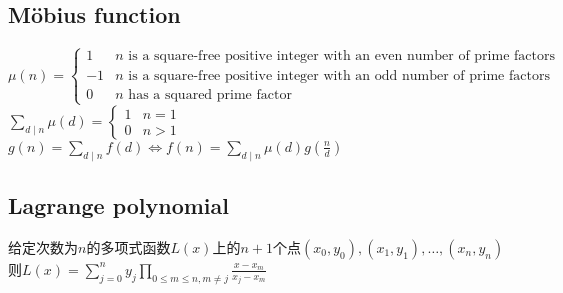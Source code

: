 	\subsection*{Möbius function}
		$ \mu(n) = \begin{cases}
			1 & n \text{ is a square-free positive integer with an even number of prime factors}\\
			-1 & n \text{ is a square-free positive integer with an odd number of prime factors}\\
			0 & n \text{ has a squared prime factor}
		\end{cases} $
		\\$ \sum\limits_{d \mid n} \mu(d) = \begin{cases}
			1 & n = 1\\
			0 & n > 1
		\end{cases} $
		\\$ g(n) = \sum\limits_{d \mid n} f(d) \Leftrightarrow f(n) = \sum\limits_{d \mid n} \mu(d) g(\frac{n}{d}) $
	\subsection*{Lagrange polynomial}
		给定次数为$ n $的多项式函数$ L(x) $上的$ n + 1 $个点$ (x_0, y_0), (x_1, y_1), \dots, (x_n, y_n) $
		\\则$ L(x) = \sum\limits_{j = 0}^{n} y_j \prod\limits_{0 \leq m \leq n, m \ne j} \frac{x - x_m}{x_j - x_m} $